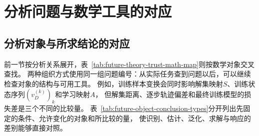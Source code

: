 \section{分析问题与数学工具的对应}
\label{sec:future-mathematical-tool-roles}

\subsection{分析对象与所求结论的对应}
\label{sec:future-object-conclusion-correspondence}

前一节按分析关系展开，表~\ref{tab:future-theory-trust-math-map}则按数学对象交叉查找。
两种组织方式使用同一组问题编号：从实际任务查到问题以后，可以继续检查对象的结构与可用工具。
例如，训练样本变换会同时影响解集映射$S$、训练状态序列$(v_D^{(k)})_k$和学习映射$A$，
但解集距离、逐步轨迹偏差和最终训练模型的损失差是三个不同的比较量。
表~\ref{tab:future-object-conclusion-types}分开列出先固定的条件、允许变化的对象和所比较的量，
使识别、估计、泛化、求解与响应的差别能够直接对照。

